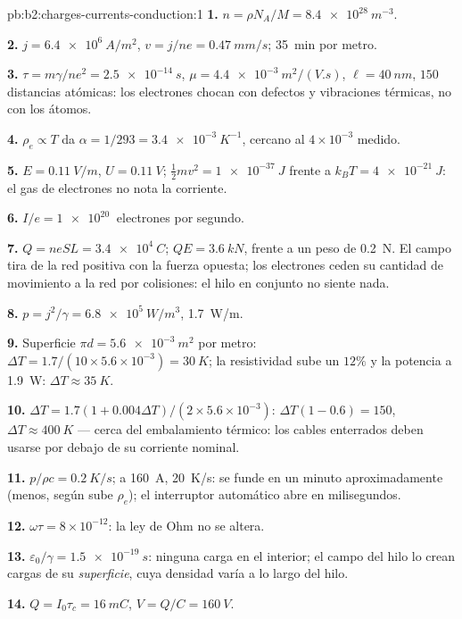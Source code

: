 \begin{solution}{pb:b2:charges-currents-conduction:1}
\textbf{1.} $n = \rho N_A/M = \qty{8.4e28}{m^{-3}}$.

\textbf{2.} $j = \qty{6.4e6}{A/m^2}$, $v = j/ne = \qty{0.47}{mm/s}$; \qty{35}{min} por metro.

\textbf{3.} $\tau = m\gamma/ne^2 = \qty{2.5e-14}{s}$, $\mu = \qty{4.4e-3}{m^2/(V.s)}$, $\ell =
\qty{40}{nm}$, $150$ distancias atómicas: los electrones chocan con defectos
y vibraciones térmicas, no con los átomos.

\textbf{4.} $\rho_e \propto T$ da $\alpha = 1/293 = \qty{3.4e-3}{K^{-1}}$, cercano al
$4 \times 10^{-3}$ medido.

\textbf{5.} $E = \qty{0.11}{V/m}$, $U = \qty{0.11}{V}$; $\tfrac12mv^2 = \qty{1e-37}{J}$ frente a
$k_BT = \qty{4e-21}{J}$: el gas de electrones no nota la corriente.

\textbf{6.} $I/e = \qty{1e20}{}$ electrones por segundo.

\textbf{7.} $Q = neSL = \qty{3.4e4}{C}$; $QE = \qty{3.6}{kN}$, frente a un peso de
\qty{0.2}{N}. El campo tira de la red positiva con la fuerza opuesta; los
electrones ceden su cantidad de movimiento a la red por colisiones: el
hilo en conjunto no siente nada.

\textbf{8.} $p = j^2/\gamma = \qty{6.8e5}{W/m^3}$, \qty{1.7}{W/m}.

\textbf{9.} Superficie $\pi d = \qty{5.6e-3}{m^2}$ por metro: $\Delta T = 1.7/(10 \times 5.6 \times
10^{-3}) = \qty{30}{K}$; la resistividad sube un $12\%$ y la potencia a \qty{1.9}{W}:
$\Delta T \approx \qty{35}{K}$.

\textbf{10.} $\Delta T = 1.7(1 + 0.004\Delta T)/(2 \times 5.6 \times 10^{-3})$: $\Delta T(1 - 0.6) = 150$,
$\Delta T \approx \qty{400}{K}$ --- cerca del embalamiento térmico: los cables
enterrados deben usarse por debajo de su corriente nominal.

\textbf{11.} $p/\rho c = \qty{0.2}{K/s}$; a \qty{160}{A}, \qty{20}{K/s}: se funde
en un minuto aproximadamente (menos, según sube $\rho_e$); el
interruptor automático abre en milisegundos.

\textbf{12.} $\omega\tau = 8 \times 10^{-12}$: la ley de Ohm no se altera.

\textbf{13.} $\varepsilon_0/\gamma = \qty{1.5e-19}{s}$: ninguna carga en el interior; el
campo del hilo lo crean cargas de su \emph{superficie}, cuya densidad
varía a lo largo del hilo.

\textbf{14.} $Q = I_0\tau_c = \qty{16}{mC}$, $V = Q/C = \qty{160}{V}$.


\end{solution}
